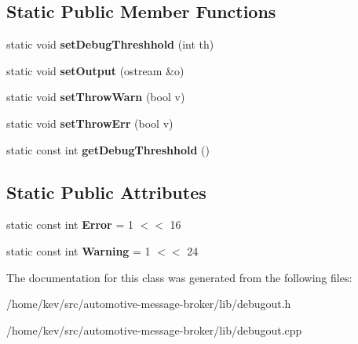 \subsection*{Static Public Member Functions}
\begin{DoxyCompactItemize}
\item 
\hypertarget{classDebugOut_a5eb2fb8c9db45f812b5dadb2fd63dcee}{static void {\bfseries set\-Debug\-Threshhold} (int th)}\label{classDebugOut_a5eb2fb8c9db45f812b5dadb2fd63dcee}

\item 
\hypertarget{classDebugOut_a89fc39319cc80007a0188b831fae32c1}{static void {\bfseries set\-Output} (ostream \&o)}\label{classDebugOut_a89fc39319cc80007a0188b831fae32c1}

\item 
\hypertarget{classDebugOut_a0651b00c0d62d93a9c57209874b2650c}{static void {\bfseries set\-Throw\-Warn} (bool v)}\label{classDebugOut_a0651b00c0d62d93a9c57209874b2650c}

\item 
\hypertarget{classDebugOut_a59402f0300c1b41f7290c8274cd08c58}{static void {\bfseries set\-Throw\-Err} (bool v)}\label{classDebugOut_a59402f0300c1b41f7290c8274cd08c58}

\item 
\hypertarget{classDebugOut_af4903a2f68a012000cc91562d0183e2a}{static const int {\bfseries get\-Debug\-Threshhold} ()}\label{classDebugOut_af4903a2f68a012000cc91562d0183e2a}

\end{DoxyCompactItemize}
\subsection*{Static Public Attributes}
\begin{DoxyCompactItemize}
\item 
\hypertarget{classDebugOut_a40314aef0df2ed8a705d9372d49b0535}{static const int {\bfseries Error} = 1 $<$$<$ 16}\label{classDebugOut_a40314aef0df2ed8a705d9372d49b0535}

\item 
\hypertarget{classDebugOut_a7a06aa04dd6cb8c1e9bcd083d30d91ad}{static const int {\bfseries Warning} = 1 $<$$<$ 24}\label{classDebugOut_a7a06aa04dd6cb8c1e9bcd083d30d91ad}

\end{DoxyCompactItemize}


The documentation for this class was generated from the following files\-:\begin{DoxyCompactItemize}
\item 
/home/kev/src/automotive-\/message-\/broker/lib/debugout.\-h\item 
/home/kev/src/automotive-\/message-\/broker/lib/debugout.\-cpp\end{DoxyCompactItemize}
